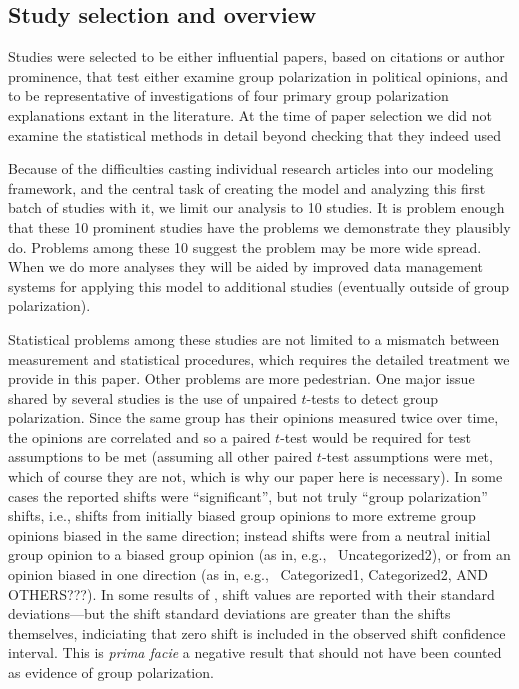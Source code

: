 \documentclass[11pt, letterpaper]{article}
\begin{document}
\subsection{Study selection and overview}

Studies were selected to be either influential papers, based on citations or
author prominence, that test either examine
group polarization in political opinions, and to be representative of investigations
of four primary group polarization explanations extant in the literature.
At the time of paper selection we did not examine the statistical methods in detail beyond
checking that they indeed used 

Because of the difficulties casting individual research articles into our modeling
framework, and the central task of creating the model and analyzing this first
batch of studies with it, we limit our analysis to 10 studies. It is problem
enough that these 10 prominent studies have the problems we demonstrate they
plausibly do. Problems among these 10 suggest the problem may be more wide spread. 
When we do more analyses
they will be aided by improved data management systems for applying this model to 
additional studies (eventually outside of group polarization).

Statistical problems among these studies are not limited to a mismatch between
measurement and statistical procedures, which requires the detailed treatment
we provide in this paper. Other problems are more pedestrian.
One major issue shared by several studies
is the use of unpaired $t$-tests to detect group polarization. Since the same
group has their opinions measured twice over time, the opinions are correlated
and so a paired $t$-test would be required for test assumptions to be met 
(assuming all other paired $t$-test assumptions were met, 
which of course they are not, which is why our paper here is necessary).
In some cases the reported shifts were ``significant'', 
but not truly ``group polarization'' shifts, i.e., 
shifts from initially biased group opinions
to more extreme group opinions biased in the same direction; instead shifts 
were from a neutral initial group opinion to a biased group opinion 
(as in, e.g.,~ Uncategorized2), or from
an opinion biased in one direction (as in, e.g.,~ Categorized1,
Categorized2, AND OTHERS???). In some results of , 
shift values are reported with their
standard deviations---but the shift standard deviations are greater than the
shifts themselves, indiciating that zero shift is included in the observed
shift confidence interval. This is \emph{prima facie} a negative result that
should not have been counted as evidence of group polarization. 
\end{document}
